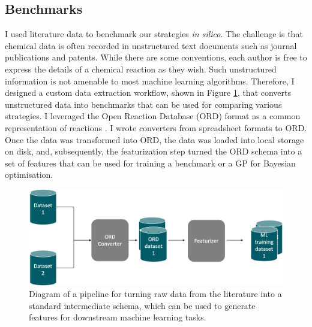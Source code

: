 \subsection{Benchmarks}

I used literature data to benchmark our strategies \textit{in silico}. The challenge is that chemical data is often recorded in unstructured text documents such as journal publications and patents. While there are some conventions, each author is free to express the details of a chemical reaction as they wish. Such unstructured information is not amenable to most machine learning algorithms. Therefore, I designed a custom data extraction workflow, shown in Figure \ref{fig:ord_pipeline}, that converts unstructured data into benchmarks that can be used for comparing various strategies. I leveraged the Open Reaction Database (ORD) format as a common representation of reactions \cite{Kearnes2021}. I wrote converters from spreadsheet formats to ORD. Once the data was transformed into ORD, the data was loaded into local storage on disk, and, subsequently, the featurization step turned the ORD schema into a set of features that can be used for training a benchmark or a GP for Bayesian optimisation.

\begin{figure}[t]
    \centering
    \includegraphics[width=\textwidth]{gfx/Chapter04/etl_pipeline.png}
    \caption{Diagram of a pipeline for turning raw data from the literature into a standard intermediate schema, which can be used to generate features for downstream machine learning tasks.}
    \label{fig:ord_pipeline}
\end{figure}

